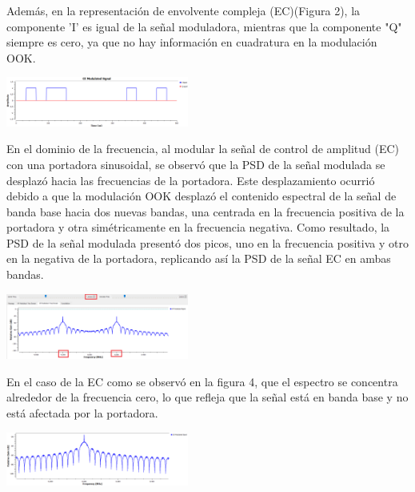 \documentclass{journal}[IEEEtran, twocolumn]             %
\begin{document}
\begin{multicols}{2}
{Además, en la representación de envolvente compleja (EC)({Figura 2}), la componente 'I' es igual de la señal moduladora, mientras que la componente "Q" siempre es cero, ya que no hay información en cuadratura en la modulación OOK. 

    \begin{center}
    \includegraphics[width=0.45\textwidth]{figs/F2.png}
    \caption{Figura 2: Gráfica en tiempo EC modulada en OOK}
    \label{fig:2}
    \end{center}

En el dominio de la frecuencia, al modular la señal de control de amplitud (EC) con una portadora sinusoidal, se observó que la PSD de la señal modulada se desplazó hacia las frecuencias de la portadora. Este desplazamiento ocurrió debido a que la modulación OOK desplazó el contenido espectral de la señal de banda base hacia dos nuevas bandas, una centrada en la frecuencia positiva de la portadora y otra simétricamente en la frecuencia negativa. Como resultado, la PSD de la señal modulada presentó dos picos, uno en la frecuencia positiva y otro en la negativa de la portadora, replicando así la PSD de la señal EC en ambas bandas.

     \begin{center}
        \includegraphics[width=0.45\textwidth]{figs/F3.png}
        \caption{Figura 3: PSD de la señal RF modulada}
        \label{fig:3}
    \end{center}

En el caso de la EC como se observó en la figura 4, que el espectro se concentra alrededor de la frecuencia cero, lo que refleja que la señal está en banda base y no está afectada por la portadora.

    \begin{center}
        \includegraphics[width=0.45\textwidth]{figs/F4.png}
        \caption{Figura 4: PSD de la EC modulada en OOK}
        \label{fig:4}
    \end{center}
   
}
\end{multicols}
\end{document}

